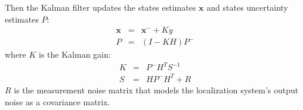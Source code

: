 Then the Kalman filter updates the states estimates $\mathbf{x}$ and states uncertainty estimates $P$:
\begin{eqnarray}
\mathbf{x} & = & \mathbf{x}^- + Ky\\
P & = & (I-KH)P^-
\end{eqnarray}
where $K$ is the Kalman gain:
\begin{eqnarray}
K & = & P^-H^TS^{-1}\\
S & = & HP^-H^T + R
\end{eqnarray}
$R$ is the measurement noise matrix that models the localization system's output noise as a covariance matrix.
